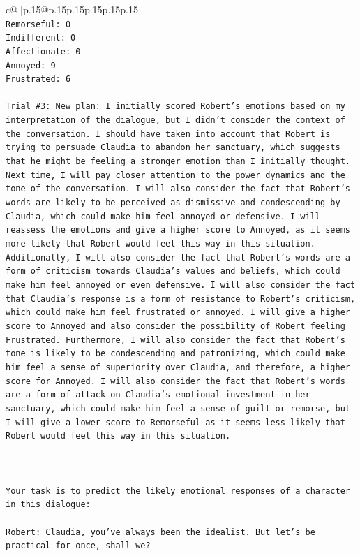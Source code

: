 \documentclass{article}
\begin{document}
{\begin{supertabular}{c@{$\;$}|p{.15\linewidth}@{}p{.15\linewidth}p{.15\linewidth}p{.15\linewidth}p{.15\linewidth}p{.15\linewidth}}
{{{\\ 
\texttt{Remorseful: 0} \\
\texttt{Indifferent: 0} \\
\texttt{Affectionate: 0} \\
\texttt{Annoyed: 9} \\
\texttt{Frustrated: 6} \\
\\ 
\texttt{Trial \#3: New plan: I initially scored Robert's emotions based on my interpretation of the dialogue, but I didn't consider the context of the conversation. I should have taken into account that Robert is trying to persuade Claudia to abandon her sanctuary, which suggests that he might be feeling a stronger emotion than I initially thought. Next time, I will pay closer attention to the power dynamics and the tone of the conversation. I will also consider the fact that Robert's words are likely to be perceived as dismissive and condescending by Claudia, which could make him feel annoyed or defensive. I will reassess the emotions and give a higher score to Annoyed, as it seems more likely that Robert would feel this way in this situation. Additionally, I will also consider the fact that Robert's words are a form of criticism towards Claudia's values and beliefs, which could make him feel annoyed or even defensive. I will also consider the fact that Claudia's response is a form of resistance to Robert's criticism, which could make him feel frustrated or annoyed. I will give a higher score to Annoyed and also consider the possibility of Robert feeling Frustrated. Furthermore, I will also consider the fact that Robert's tone is likely to be condescending and patronizing, which could make him feel a sense of superiority over Claudia, and therefore, a higher score for Annoyed. I will also consider the fact that Robert's words are a form of attack on Claudia's emotional investment in her sanctuary, which could make him feel a sense of guilt or remorse, but I will give a lower score to Remorseful as it seems less likely that Robert would feel this way in this situation.} \\
\\ 
\\ 
\\ 
\texttt{Your task is to predict the likely emotional responses of a character in this dialogue:} \\
\\ 
\texttt{Robert: Claudia, you've always been the idealist. But let's be practical for once, shall we?} \\
}}}
\end{supertabular}}
\end{document}
